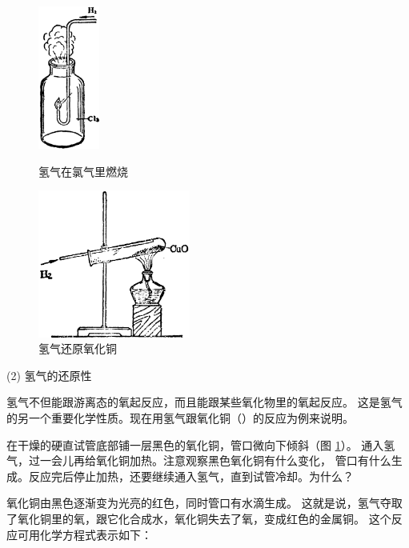 \begin{figure}[htbp]
    \centering
    \begin{minipage}[b]{7cm}
        \centering
        \includegraphics[width=2cm]{../pic/czhx1-ch2-10}
        \caption{氢气在氯气里燃烧}\label{fig:2-10}
    \end{minipage}
    \qquad
    \begin{minipage}[b]{7cm}
        \centering
        \includegraphics[width=5cm]{../pic/czhx1-ch2-11}
        \caption{氢气还原氧化铜}\label{fig:2-11}
    \end{minipage}
\end{figure}

(2) 氢气的还原性

氢气不但能跟游离态的氧起反应，而且能跟某些氧化物里的氧起反应。
这是氢气的另一个重要化学性质。现在用氢气跟氧化铜（）的反应为例来说明。

\begin{shiyan}
    在干燥的硬直试管底部铺一层黑色的氧化铜，管口微向下倾斜（图 \ref{fig:2-11}）。
    通入氢气，过一会儿再给氧化铜加热。注意观察黑色氧化铜有什么变化，
    管口有什么生成。反应完后停止加热，还要继续通入氢气，直到试管冷却。为什么？
\end{shiyan}

氧化铜由黑色逐渐变为光亮的红色，同时管口有水滴生成。
这就是说，氢气夺取了氧化铜里的氧，跟它化合成水，氧化铜失去了氧，变成红色的金属铜。
这个反应可用化学方程式表示如下：
\begin{fangchengshi}
\end{fangchengshi}

